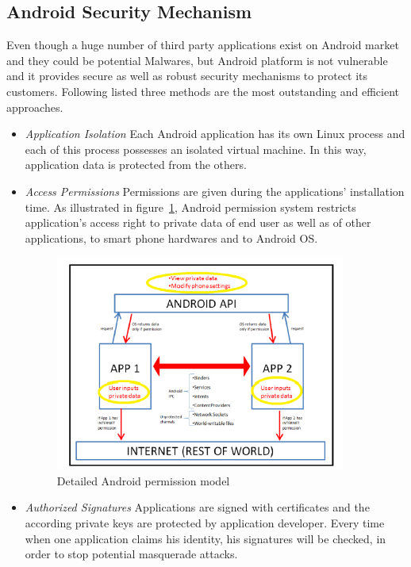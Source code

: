 \subsection{Android Security Mechanism}
Even though a huge number of third party applications exist on Android market and they could be potential Malwares, but Android platform is not vulnerable and it provides secure as well as robust security mechanisms to protect its customers. Following listed three methods are the most outstanding and efficient approaches.
\begin{itemize}
\item \emph{Application Isolation} Each Android application has its own Linux process and each of this process possesses an isolated virtual machine. In this way,  application data is protected from the others\cite{android_secure_language}. 
\item \emph{Access Permissions} Permissions are given during the applications' installation time. As illustrated in figure~\ref{fig:android-permission}, Android permission system restricts application's access right to private data of end user as well as of other applications, to smart phone hardwares and to Android OS. 
\begin{figure}[!htbp]
	\centering
	\includegraphics[width=0.9\textwidth]{android-permission.jpg}
		\caption{Detailed Android permission model\cite{android_secure_design}}
	\label{fig:android-permission}
\end{figure}
\item \emph{Authorized Signatures} Applications are signed with certificates and the according private keys are protected by application developer. Every time when one application claims his identity, his signatures will be checked, in order to stop potential masquerade attacks\cite{android_secure_language}.
\end{itemize}

